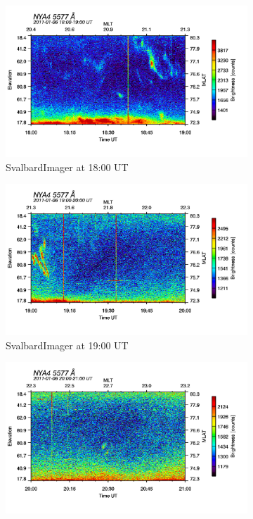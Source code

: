 \documentclass[10pt,a4paper]{article}
\begin{document}
\begin{figure}[h]
\centering
\begin{subfigure}{0.3\textwidth}
\centering
	\includegraphics[width=\textwidth]{SvalbardImager5577A18.png}
	\caption{ SvalbardImager at 18:00 UT \label{SBI_5_18}}
\end{subfigure}
\begin{subfigure}{0.3\textwidth}
\centering
	\includegraphics[width=\textwidth]{SvalbardImager5577A19.png}
	\caption{ SvalbardImager at 19:00 UT \label{SBI_5_19}}
\end{subfigure}
\begin{subfigure}{0.3\textwidth}
\centering
	\includegraphics[width=\textwidth]{SvalbardImager5577A20.png}

\end{subfigure}
\end{figure}
\end{document}
